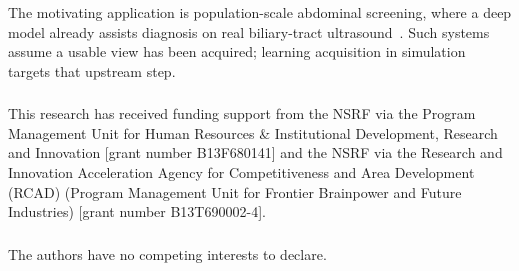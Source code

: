 \documentclass[runningheads]{llncs}
\begin{document}
The motivating application is population-scale abdominal screening, where a deep model already assists diagnosis on real biliary-tract ultrasound~\cite{intharah2023bitnet}. Such systems assume a usable view has been acquired; learning acquisition in simulation targets that upstream step.

\begin{credits}
\subsubsection{\ackname}
This research has received funding support from the NSRF via the Program Management
Unit for Human Resources \& Institutional Development, Research and Innovation [grant
number B13F680141] and the NSRF via the Research and Innovation Acceleration Agency
for Competitiveness and Area Development (RCAD) (Program Management Unit for Frontier
Brainpower and Future Industries) [grant number B13T690002-4].

\subsubsection{\discintname}
The authors have no competing interests to declare.
\end{credits}



\end{document}

